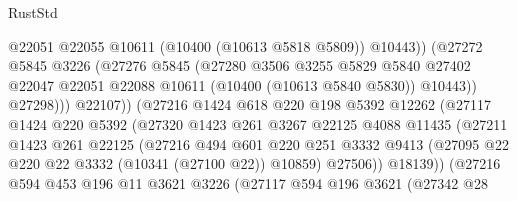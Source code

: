 \begin{lexlean}{RustStd}
\begin{coremodule}
                                  @22051
                                  @22055
                                  @10611
                                  (@10400 (@10613 @5818 @5809))
                                  @10443))
                              (@27272
                                @5845
                                @3226
                                (@27276
                                  @5845
                                  (@27280
                                    @3506
                                    @3255
                                    @5829
                                    @5840
                                    @27402
                                    @22047
                                    @22051
                                    @22088
                                    @10611
                                    (@10400 (@10613 @5840 @5830))
                                    @10443))
                                @27298)))
                          @22107))
                      (@27216
                        @1424
                        @618
                        @220
                        @198
                        @5392
                        @12262
                        (@27117
                          @1424
                          @220
                          @5392
                          (@27320
                            @1423
                            @261
                            @3267
                            @22125
                            @4088
                            @11435
                            (@27211
                              @1423
                              @261
                              @22125
                              (@27216
                                @494
                                @601
                                @220
                                @251
                                @3332
                                @9413
                                (@27095 @22 @220 @22 @3332 (@10341 (@27100 @22)) @10859)
                                @27506))
                            @18139))
                        (@27216
                          @594
                          @453
                          @196
                          @11
                          @3621
                          @3226
                          (@27117
                            @594
                            @196
                            @3621
                            (@27342
                              @28

\end{coremodule}
\end{lexlean}
